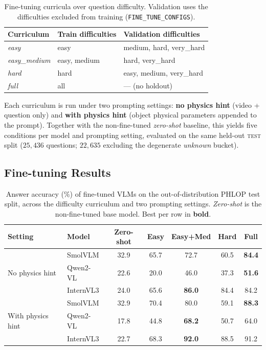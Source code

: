 \begin{table}[t]
\centering
\caption{Fine-tuning curricula over question difficulty. Validation uses the
difficulties excluded from training (\texttt{FINE\_TUNE\_CONFIGS}).}
\label{tab:ftconfig}
\small
\begin{tabular}{lll}
\toprule
Curriculum & Train difficulties & Validation difficulties \\
\midrule
\textit{easy}         & easy         & medium, hard, very\_hard \\
\textit{easy\_medium} & easy, medium & hard, very\_hard \\
\textit{hard}         & hard         & easy, medium, very\_hard \\
\textit{full}         & all          & --- (no holdout) \\
\bottomrule
\end{tabular}
\end{table}

Each curriculum is run under two prompting settings: \textbf{no physics hint}
(video + question only) and \textbf{with physics hint} (object physical
parameters appended to the prompt). Together with the non-fine-tuned
\emph{zero-shot} baseline, this yields five conditions per model and prompting
setting, evaluated on the same held-out \textsc{test} split
($25{,}436$ questions; $22{,}635$ excluding the degenerate \textit{unknown}
bucket).


\subsection{Fine-tuning Results}
\label{sec:finetune-results}

\begin{table}[t]
\centering
\caption{Answer accuracy (\%) of fine-tuned VLMs on the out-of-distribution
PHLOP test split, across the difficulty curriculum and two prompting settings.
\textit{Zero-shot} is the non-fine-tuned base model. Best per row in
\textbf{bold}.}
\label{tab:finetune-ablation}
\begin{tabular}{llccccc}
\toprule
Setting & Model & Zero-shot & Easy & Easy+Med & Hard & Full \\
\midrule
\multirow{3}{*}{No physics hint}
 & SmolVLM   & 32.9 & 65.7 & 72.7 & 60.5 & \textbf{84.4} \\
 & Qwen2-VL  & 22.6 & 20.0 & 46.0 & 37.3 & \textbf{51.6} \\
 & InternVL3 & 24.0 & 65.6 & \textbf{86.0} & 84.4 & 84.2 \\
\midrule
\multirow{3}{*}{With physics hint}
 & SmolVLM   & 32.9 & 70.4 & 80.0 & 59.1 & \textbf{88.3} \\
 & Qwen2-VL  & 17.8 & 44.8 & \textbf{68.2} & 50.7 & 64.0 \\
 & InternVL3 & 22.7 & 68.3 & \textbf{92.0} & 88.5 & 91.2 \\
\bottomrule
\end{tabular}
\end{table}

